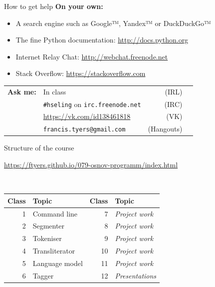 \documentclass[10pt, compress]{beamer}
\begin{document}
\begin{frame}{How to get help}
\textbf{On your own:}
\begin{itemize}
  \item A search engine such as Google™, Yandex™ or DuckDuckGo™
  \item The fine Python documentation: \url{http://docs.python.org}
  \item Internet Relay Chat: \url{http://webchat.freenode.net}
  \item Stack Overflow: \url{https://stackoverflow.com}
\end{itemize}

\begin{center}
\begin{tabularx}{\textwidth}{lXrl}
   \textbf{Ask me:} &       In class & (IRL) \\
                 & {\tt \#hseling} on {\tt irc.freenode.net} & (IRC) \\
                 & \url{https://vk.com/id138461818} & (VK) \\
                 & {\tt francis.tyers@gmail.com} & (Hangouts) \\ 
\end{tabularx}
\end{center}

\end{frame}

\begin{frame}{Structure of the course}

\begin{center}
\url{https://ftyers.github.io/079-osnov-programm/index.html}
\end{center}
~\\
\begin{center}
\begin{tabular}{rlrl}
\textbf{Class} & \textbf{Topic}   & \textbf{Class} & \textbf{Topic} \\
\hline
1  & Command line & 7   & \emph{Project work}  \\
2  & Segmenter & 8   &  \emph{Project work} \\
3  & Tokeniser & 9   &  \emph{Project work} \\
4  & Transliterator & 10   &  \emph{Project work} \\
5  & Language model & 11   & \emph{Project work}  \\
6  & Tagger & 12   & \emph{Presentations}  \\
\end{tabular}
\end{center}


\end{frame}
\end{document}
